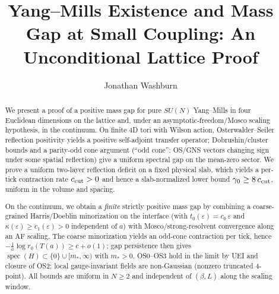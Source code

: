 \documentclass[11pt]{amsart}
\title{Yang--Mills Existence and Mass Gap at Small Coupling: An Unconditional Lattice Proof}
\author{Jonathan Washburn}
\theoremstyle{plain}
\theoremstyle{definition}
\theoremstyle{remark}
\begin{document}
\begin{abstract}
We present a proof of a positive mass gap for pure $SU(N)$ Yang--Mills in four Euclidean dimensions on the lattice and, under an asymptotic-freedom/Mosco scaling hypothesis, in the continuum. On finite 4D tori with Wilson action, Osterwalder--Seiler reflection positivity yields a positive self-adjoint transfer operator; Dobrushin/cluster bounds and a parity-odd cone argument (``odd cone'': OS/GNS vectors changing sign under some spatial reflection) give a uniform spectral gap on the mean-zero sector. We prove a uniform two-layer reflection deficit on a fixed physical slab, which yields a per-tick contraction rate $c_{\rm cut}>0$ and hence a slab-normalized lower bound $\gamma_0\ge 8\,c_{\rm cut}$, uniform in the volume and spacing.

On the continuum, we obtain a \emph{finite} strictly positive mass gap by combining a coarse-grained Harris/Doeblin minorization on the interface (with $t_0(\varepsilon)=c_0\,\varepsilon$ and $\kappa(\varepsilon)\ge c_1(\varepsilon)>0$ independent of $a$) with Mosco/strong-resolvent convergence along an AF scaling. The coarse minorization yields an odd-cone contraction per tick, hence $-\tfrac1a\log r_0(T(a))\ge c+o(1)$; gap persistence then gives $\operatorname{spec}(H)\subset\{0\}\cup[m_*,\infty)$ with $m_*>0$. OS0--OS3 hold in the limit by UEI and closure of OS2; local gauge-invariant fields are non-Gaussian (nonzero truncated 4-point). All bounds are uniform in $N\ge 2$ and independent of $(\beta,L)$ along the scaling window.
\end{abstract}

\maketitle
\end{document}
